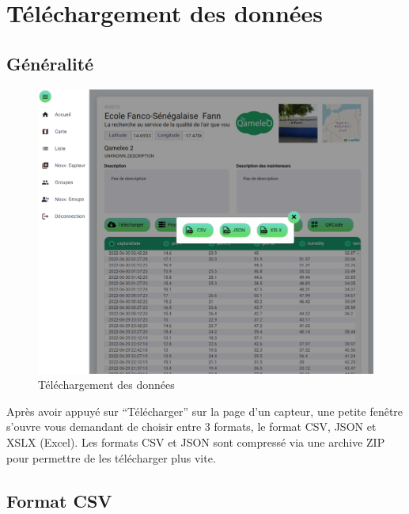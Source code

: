 \section{Téléchargement des données}\label{sec:telechargement-des-donnes}

    \subsection{Généralité}\label{subsec:generalite}

    \begin{figure}[H]
        \begin{center}
            \includegraphics[width=12cm]{resources/sensor_download}
        \end{center}
        \caption{Téléchargement des données}\label{fig:telechargement-des-donnes}
    \end{figure}

    Après avoir appuyé sur ``Télécharger'' sur la page d'un capteur, une petite fenêtre
    s'ouvre vous demandant de choisir entre 3 formats, le format CSV, JSON et XSLX (Excel).
    Les formats CSV et JSON sont compressé via une archive ZIP pour permettre de les télécharger plus vite.

    \subsection{Format CSV}\label{subsec:csv}

